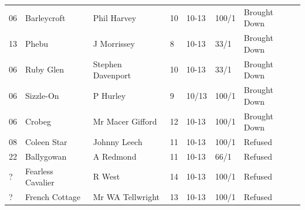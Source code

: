 \documentclass{article}
\begin{document}
\begin{tabular}{lllllll}
06 & Barleycroft & Phil Harvey & 10 & 10-13 & 100/1 & Brought Down \\
13 & Phebu & J Morrissey & 8 & 10-13 & 33/1 & Brought Down \\
06 & Ruby Glen & Stephen Davenport & 10 & 10-13 & 33/1 & Brought Down \\
06 & Sizzle-On & P Hurley & 9 & 10/13 & 100/1 & Brought Down \\
06 & Crobeg & Mr Macer Gifford & 12 & 10-13 & 100/1 & Brought Down \\
08 & Coleen Star & Johnny Leech & 11 & 10-13 & 100/1 & Refused \\
22 & Ballygowan & A Redmond & 11 & 10-13 & 66/1 & Refused \\
? & Fearless Cavalier & R West & 14 & 10-13 & 100/1 & Refused \\
? & French Cottage & Mr WA Tellwright & 13 & 10-13 & 100/1 & Refused \\
\bottomrule
\end{tabular}
\end{document}
